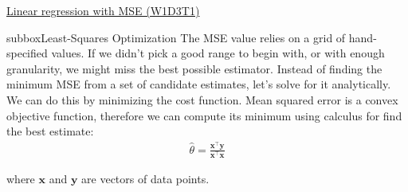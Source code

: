 \begin{textbox}{\href{https://compneuro.neuromatch.io/tutorials/W1D3_ModelFitting/chapter_title.html}{Linear regression with MSE (W1D3T1)}}
\begin{subbox}{subbox}{Least-Squares Optimization}
\scriptsize
The MSE value relies on a grid of hand-specified values. If we didn't pick a good range to begin with, or with enough granularity, we might miss the best possible estimator. Instead of finding the minimum MSE from a set of candidate estimates, let's solve for it analytically.
We can do this by minimizing the cost function. Mean squared error is a convex objective function, therefore we can compute its minimum using calculus for find the best estimate: \begin{align}
\hat\theta = \frac{\mathbf{x}^\top \mathbf{y}}{\mathbf{x}^\top \mathbf{x}}
\end{align}

where $\mathbf{x}$ and $\mathbf{y}$ are vectors of data points.

\end{subbox}

\end{textbox}
